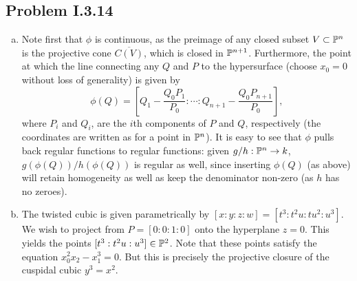 \documentclass{../mathnotes}
\begin{document}
\subsection*{Problem I.3.14}
\begin{enumerate}[(a)]
    \item Note first that $\phi$ is continuous, as the preimage of any closed subset $V\subset \mathbb{P}^n$
        is the projective cone $\overline{C(V)}$, which is closed in $\mathbb{P}^{n+1}$. 
        Furthermore, the point at which the line connecting any $Q$ and $P$ to the hypersurface
        (choose $x_0=0$ without loss of generality) is given by 
        \[\phi(Q)=[Q_1-\frac{Q_0P_1}{P_0}:\cdots:Q_{n+1}-\frac{Q_0P_{n+1}}{P_0}],\]
        where $P_i$ and $Q_i$, are the $i$th components of $P$ and $Q$, respectively (the coordinates
        are written as for a point in $\mathbb{P}^n$).
        It is easy to see that $\phi$
        pulls back regular functions to regular functions: given $g/h:\mathbb{P}^n\to k$, $g(\phi(Q))/h(\phi(Q))$
        is regular as well, since inserting $\phi(Q)$ (as above) will retain homogeneity as well as
        keep the denominator non-zero (as $h$ has no zeroes).
    \item The twisted cubic is given parametrically by $[x:y:z:w]=[t^3:t^2u:tu^2:u^3]$. We wish
        to project from $P=[0:0:1:0]$ onto the hyperplane $z=0$. This yields the points
        $[t^3:t^2u:u^3]\in\mathbb{P}^2$. Note that these points satisfy the equation $x_0^2x_2-x_1^3=0$.
        But this is precisely the projective closure of the cuspidal cubic $y^3=x^2$.
\end{enumerate}
\end{document}
